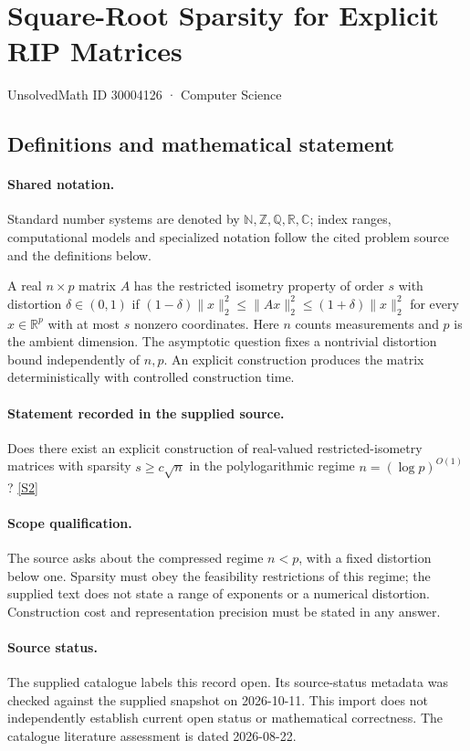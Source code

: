 \documentclass[11pt]{article}
\newcommand{\sref}[2]{\hyperlink{source:#1:#2}{[S#2]}}
\begin{document}
\setcounter{section}{30004125}
\section{Square-Root Sparsity for Explicit RIP Matrices}\label{30004126}
{\small\sffamily UnsolvedMath ID 30004126 · Computer Science}
\subsection{Definitions and mathematical statement}

\paragraph{Shared notation.}Standard number systems are denoted by $\mathbb N,\mathbb Z,\mathbb Q,\mathbb R,\mathbb C$; index ranges, computational models and specialized notation follow the cited problem source and the definitions below.


A real $n\times p$ matrix $A$ has the restricted isometry property of order $s$ with distortion $\delta\in(0,1)$ if $(1-\delta)\|x\|_2^2\leq\|Ax\|_2^2\leq(1+\delta)\|x\|_2^2$ for every $x\in\mathbb R^p$ with at most $s$ nonzero coordinates. Here $n$ counts measurements and $p$ is the ambient dimension. The asymptotic question fixes a nontrivial distortion bound independently of $n,p$. An explicit construction produces the matrix deterministically with controlled construction time.
\paragraph{Statement recorded in the supplied source.}
Does there exist an explicit construction of real-valued restricted-isometry matrices with sparsity $s\geq c\sqrt n$ in the polylogarithmic regime $n=(\log p)^{O(1)}$? \sref{30004126}{2}
\paragraph{Scope qualification.}
The source asks about the compressed regime $n<p$, with a fixed distortion below one. Sparsity must obey the feasibility restrictions of this regime; the supplied text does not state a range of exponents or a numerical distortion. Construction cost and representation precision must be stated in any answer.
\paragraph{Source status.}
The supplied catalogue labels this record open. Its source-status metadata was checked against the supplied snapshot on 2026-10-11. This import does not independently establish current open status or mathematical correctness. The catalogue literature assessment is dated 2026-08-22.
\end{document}
